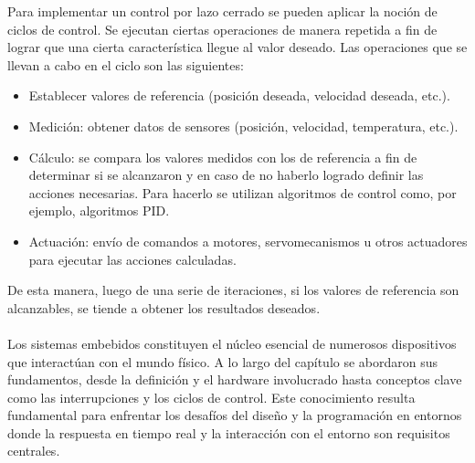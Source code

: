 Para implementar un control por lazo cerrado se pueden aplicar la noción de ciclos de control. Se ejecutan ciertas operaciones de manera repetida a fin de lograr que una cierta característica llegue al valor deseado. Las operaciones que se llevan a cabo en el ciclo son las siguientes:

\begin{itemize}
\item Establecer valores de referencia (posición deseada, velocidad deseada, etc.).
\item Medición: obtener datos de sensores (posición, velocidad, temperatura, etc.).
\item Cálculo: se compara los valores medidos con los de referencia a fin de determinar si se alcanzaron y en caso de no haberlo logrado definir las acciones necesarias. Para hacerlo se utilizan algoritmos de control como, por ejemplo, algoritmos \gls{PID}.
\item Actuación: envío de comandos a motores, \gls{servomecanismos} u otros actuadores para ejecutar las acciones calculadas.
\end{itemize}

De esta manera, luego de una serie de iteraciones, si los valores de referencia son alcanzables, se tiende a obtener los resultados deseados.
\\\\
Los sistemas embebidos constituyen el núcleo esencial de numerosos dispositivos que interactúan con el mundo físico. A lo largo del capítulo se abordaron sus fundamentos, desde la definición y el hardware involucrado hasta conceptos clave como las interrupciones y los ciclos de control. Este conocimiento resulta fundamental para enfrentar los desafíos del diseño y la programación en entornos donde la respuesta en tiempo real y la interacción con el entorno son requisitos centrales.
